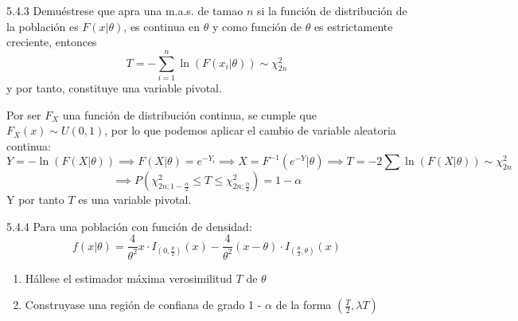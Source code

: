 \begin{problem}{5.4.3}
    Demuéstrese que apra una m.a.s. de tamao $n$ si la función de distribución de la población es $F(x | \theta)$, es continua en $\theta$ y como función de $\theta$ es estrictamente creciente, entonces
    $$T = -\sum_{i=1}^{n} \ln(F(x_i | \theta)) \sim \chi^2_{2n}$$
    y por tanto, constituye una variable pivotal.
\end{problem}
\begin{sol}
    Por ser $F_X$ una función de distribución continua, se cumple que $F_X(x) \sim U(0,1)$, por lo que podemos aplicar el cambio de variable aleatoria continua:
    $$Y = -\ln(F(X | \theta)) \implies F(X | \theta) = e^{-Y_i} \implies X = F^{-1}(e^{-Y} | \theta) \implies T = -2\sum \ln(F(X | \theta)) \sim \chi^2_{2n}$$
    $$\implies P\left(\chi^2_{2n; 1 - \frac{\alpha}{2}} \leq T \leq \chi^2_{2n; \frac{\alpha}{2}}\right) = 1 - \alpha$$
    Y por tanto $T$ es una variable pivotal. 
\end{sol}
\begin{problem}{5.4.4}
    Para una población con función de densidad: 
    $$f(x | \theta) = \frac{4}{\theta^2}x \cdot I_{(0, \frac{\theta}{2})}(x) - \frac{4}{\theta^2}(x - \theta) \cdot I_{(\frac{\theta}{2}, \theta)}(x)$$
    \begin{enumerate}
        \item Hállese el estimador máxima verosimilitud $T$ de $\theta$ 
        \item Construyase una región de confiana de grado 1 - $\alpha$ de la forma $(\frac{T}{2}, \lambda T)$
    \end{enumerate}
\end{problem}
